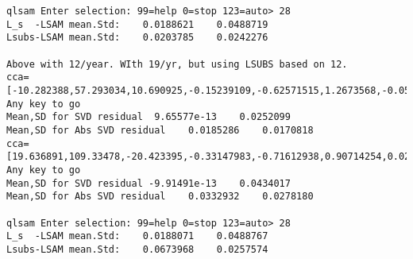\documentclass[draft]{article}
\begin{document}
\begin{verbatim}
qlsam Enter selection: 99=help 0=stop 123=auto> 28
L_s  -LSAM mean.Std:    0.0188621    0.0488719
Lsubs-LSAM mean.Std:    0.0203785    0.0242276

Above with 12/year. WIth 19/yr, but using LSUBS based on 12. 
cca=[-10.282388,57.293034,10.690925,-0.15239109,-0.62571515,1.2673568,-0.050011825,-0.41772512]
Any key to go
Mean,SD for SVD residual  9.65577e-13    0.0252099
Mean,SD for Abs SVD residual    0.0185286    0.0170818
cca=[19.636891,109.33478,-20.423395,-0.33147983,-0.71612938,0.90714254,0.029221834,-0.99989311]
Any key to go
Mean,SD for SVD residual -9.91491e-13    0.0434017
Mean,SD for Abs SVD residual    0.0332932    0.0278180

qlsam Enter selection: 99=help 0=stop 123=auto> 28
L_s  -LSAM mean.Std:    0.0188071    0.0488767
Lsubs-LSAM mean.Std:    0.0673968    0.0257574
\end{verbatim}

\end{document}
